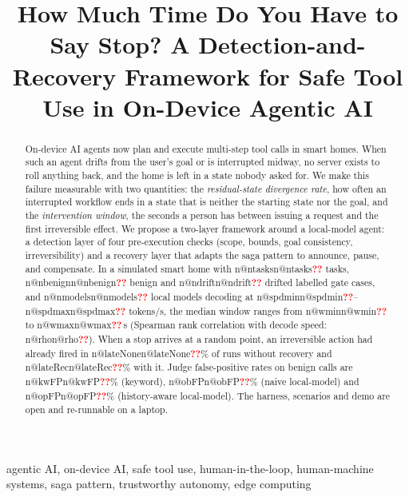\documentclass[conference]{IEEEtran}
\makeatletter
\newcommand{\pend}{\textcolor{red}{\textbf{??}}}
\newcommand{\num}[1]{\ifcsname n@#1\endcsname\csname n@#1\endcsname\else\pend\fi}
\makeatother
\begin{document}
\title{How Much Time Do You Have to Say Stop? A Detection-and-Recovery Framework for Safe Tool Use in On-Device Agentic AI}

\author{
}
\maketitle

\begin{abstract}
On-device AI agents now plan and execute multi-step tool calls in smart homes. When such an agent drifts from the user's goal or is interrupted midway, no server exists to roll anything back, and the home is left in a state nobody asked for. We make this failure measurable with two quantities: the \emph{residual-state divergence rate}, how often an interrupted workflow ends in a state that is neither the starting state nor the goal, and the \emph{intervention window}, the seconds a person has between issuing a request and the first irreversible effect. We propose a two-layer framework around a local-model agent: a detection layer of four pre-execution checks (scope, bounds, goal consistency, irreversibility) and a recovery layer that adapts the saga pattern to announce, pause, and compensate. In a simulated smart home with \num{ntasks} tasks, \num{nbenign} benign and \num{ndrift} drifted labelled gate cases, and \num{nmodels} local models decoding at \num{spdmin}--\num{spdmax} tokens/s, the median window ranges from \num{wmin} to \num{wmax}\,s (Spearman rank correlation with decode speed: \num{rho}). When a stop arrives at a random point, an irreversible action had already fired in \num{lateNone}\% of runs without recovery and \num{lateRec}\% with it. Judge false-positive rates on benign calls are \num{kwFP}\% (keyword), \num{obFP}\% (naive local-model) and \num{opFP}\% (history-aware local-model). The harness, scenarios and demo are open and re-runnable on a laptop.
\end{abstract}

\begin{IEEEkeywords}
agentic AI, on-device AI, safe tool use, human-in-the-loop, human-machine systems, saga pattern, trustworthy autonomy, edge computing
\end{IEEEkeywords}
\end{document}
